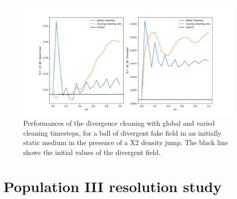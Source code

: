 \documentclass[11pt]{article}
\begin{document}
\begin{figure}[!htb]
         \centering
		\includegraphics[width=18cm]{divB_static.png}
		\caption{Performances of the \cite{Dedner2002} divergence cleaning with global and varied cleaning timesteps, for a ball of divergent fake field in an initially static medium in the presence of a X2 density jump. The black line shows the initial values of the divergent field.}
		\label{fig:static}
\end{figure}

\section{Population III resolution study}
\label{sub:popIIIme}
\end{document}
